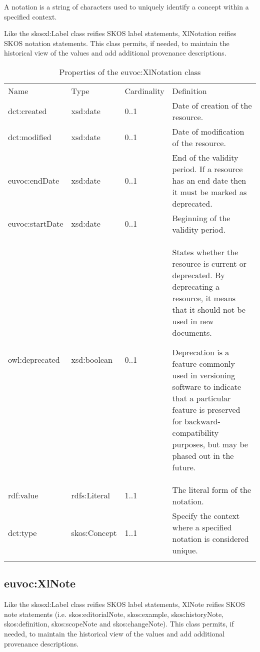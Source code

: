 A notation is a string of characters used to uniquely identify a concept
within a specified context.

Like the skosxl:Label class reifies SKOS label statements, XlNotation
reifies SKOS notation statements. This class permits, if needed, to
maintain the historical view of the values and add additional provenance
descriptions.
{
	\footnotesize
	\selectfont%
	\begin{longtable}[c]{@{}p{3cm}p{2cm}p{2cm}p{7.8cm}@{}}
		\toprule\addlinespace
		Name & Type & Cardinality & Definition
		\\\addlinespace
		\midrule\endhead
		dct:created & xsd:date & 0..1 & Date of creation of the resource.
		\\\addlinespace
		dct:modified & xsd:date & 0..1 & Date of modification of the resource.
		\\\addlinespace
		euvoc:endDate & xsd:date & 0..1 & End of the validity period. If a
		resource has an end date then it must be marked as deprecated.
		\\\addlinespace
		euvoc:startDate & xsd:date & 0..1 & Beginning of the validity period.
		\\\addlinespace
		owl:deprecated & xsd:boolean & 0..1 & States whether the resource is
		current or deprecated. By deprecating a resource, it means that it
		should not be used in new documents.
		
		Deprecation is a feature commonly used in versioning software to
		indicate that a particular feature is preserved for
		backward-compatibility purposes, but may be phased out in the future.
		\\\addlinespace
		rdf:value & rdfs:Literal & 1..1 & The literal form of the notation.
		\\\addlinespace
		dct:type & skos:Concept & 1..1 & Specify the context where a specified
		notation is considered unique.
		\\\addlinespace
		\bottomrule
		\addlinespace
		\caption{Properties of the euvoc:XlNotation class}
	\end{longtable}
}

\subsection{euvoc:XlNote}

Like the skosxl:Label class reifies SKOS label statements, XlNote
reifies SKOS note statements (i.e. skos:editorialNote, skos:example,
skos:historyNote, skos:definition, skos:scopeNote and skos:changeNote).
This class permits, if needed, to maintain the historical view of the
values and add additional provenance descriptions.

